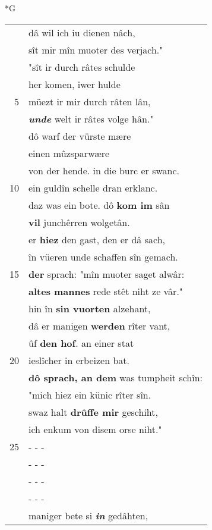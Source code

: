 \documentclass[8pt,a4paper,notitlepage]{article}
\begin{document}
\begin{table}[ht]
\begin{minipage}[t]{0.5\linewidth}
\small
\begin{center}*G
\end{center}
\begin{tabular}{rl}
 & dâ wil ich iu dienen nâch,\\ 
 & sît mir mîn muoter des verjach."\\ 
 & "sît ir durch râtes schulde\\ 
 & her komen, iwer hulde\\ 
5 & müezt ir mir durch râten lân,\\ 
 & \textit{\textbf{unde}} welt ir râtes volge hân."\\ 
 & dô warf der vürste mære\\ 
 & einen mûzsparwære\\ 
 & von der hende. in die burc er swanc.\\ 
10 & ein guldîn schelle dran erklanc.\\ 
 & daz was ein bote. dô \textbf{kom im} sân\\ 
 & \textbf{vil} junchêrren wolgetân.\\ 
 & er \textbf{hiez} den gast, den er dâ sach,\\ 
 & în vüeren unde schaffen sîn gemach.\\ 
15 & \textbf{der} sprach: "mîn muoter saget alwâr:\\ 
 & \textbf{altes mannes} rede stêt niht ze vâr."\\ 
 & hin în \textbf{sin vuorten} alzehant,\\ 
 & dâ er manigen \textbf{werden} rîter vant,\\ 
 & ûf \textbf{den hof}. an einer stat\\ 
20 & ieslîcher in erbeizen bat.\\ 
 & \textbf{dô sprach, an dem} was tumpheit schîn:\\ 
 & "mich hiez ein künic rîter sîn.\\ 
 & swaz halt \textbf{drûffe mir} geschiht,\\ 
 & ich enkum von disem orse niht."\\ 
25 & \multicolumn{1}{l}{ - - - }\\ 
 & \multicolumn{1}{l}{ - - - }\\ 
 & \multicolumn{1}{l}{ - - - }\\ 
 & \multicolumn{1}{l}{ - - - }\\ 
 & maniger bete si \textit{\textbf{in}} gedâhten,\\ 

\end{tabular}
\end{minipage}
\end{table}
\end{document}
